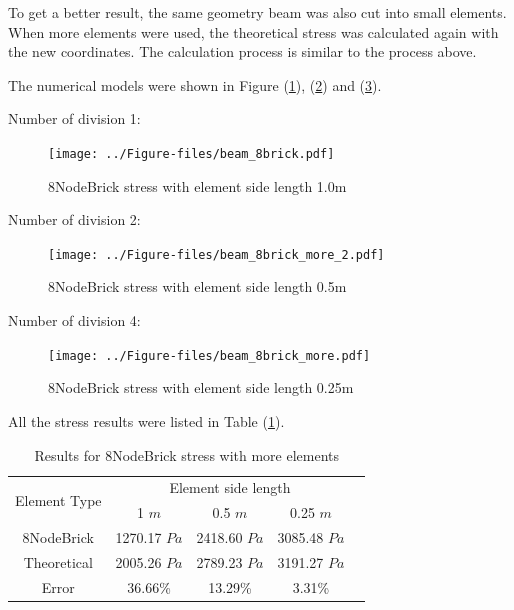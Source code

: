\documentclass[fleqn,11pt]{article}
\begin{document}
To get a better result, the same geometry beam was also cut into small elements. When more elements were used, the theoretical stress was calculated again with the new coordinates. The calculation process is similar to the process above. 

The numerical models were shown in Figure (\ref{fig 8NodeBrick stress with element side length 1.0m}), (\ref{fig 8NodeBrick stress with element side length 0.5m}) and (\ref{fig 8NodeBrick stress with element side length 0.25m}). 


Number of division 1:

\begin{figure}[H]
  \centering
  \texttt{[image: ../Figure-files/beam\_8brick.pdf]}
  \caption{8NodeBrick stress with element side length 1.0m}
  \label{fig 8NodeBrick stress with element side length 1.0m}
\end{figure}

Number of division 2:

\begin{figure}[H]
  \centering
  \texttt{[image: ../Figure-files/beam\_8brick\_more\_2.pdf]}
  \caption{8NodeBrick stress with element side length 0.5m}
  \label{fig 8NodeBrick stress with element side length 0.5m}
\end{figure}

Number of division 4:

\begin{figure}[H]
  \centering
  \texttt{[image: ../Figure-files/beam\_8brick\_more.pdf]}
  \caption{8NodeBrick stress with element side length 0.25m}
  \label{fig 8NodeBrick stress with element side length 0.25m}
\end{figure}


All the stress results were listed in Table (\ref{table Results for 8NodeBrick stress with more elements}). 


\begin{table}[H]
  \centering
  \caption{Results for 8NodeBrick stress with more elements}
  \label{table Results for 8NodeBrick stress with more elements}
  \begin{tabular}{|c|c|c|c|c|}
    \hline 
    \multirow{2}{*}{Element Type} 
       & \multicolumn{3}{|c|}{Element side length} \\ \cline{2-4}
       & 1 $m$ & 0.5 $m$ & 0.25 $m$ \\                              \hline
8NodeBrick & 1270.17 $Pa$ & 2418.60 $Pa$ & 3085.48 $Pa$ \\ \hline
Theoretical & 2005.26 $Pa$ & 2789.23 $Pa$ & 3191.27 $Pa$ \\ \hline
Error      & 36.66\% & 13.29\% & 3.31\%  \\ \hline
  \end{tabular}
\end{table}
\end{document}

